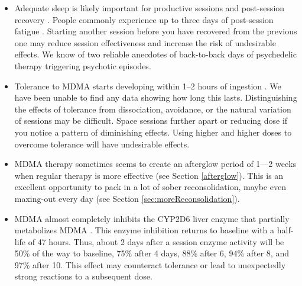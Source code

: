 \documentclass[12pt,letterpaper]{book}
\begin{document}
\begin{itemize}
    \item Adequate sleep is likely important for productive sessions and post-session recovery \cite{simon2020sleep}. People commonly experience up to three days of post-session fatigue \cite{liechtiGender}. Starting another session before you have recovered from the previous one may reduce session effectiveness and increase the risk of undesirable effects. We know of two reliable anecdotes of back-to-back days of psychedelic therapy triggering psychotic episodes. 
    \item Tolerance to MDMA starts developing within 1–2 hours of ingestion \cite{farreTolerance,parrottTolerance}. We have been unable to find any data showing how long this lasts. Distinguishing the effects of tolerance from dissociation, avoidance, or the natural variation of sessions may be difficult. Space sessions further apart or reducing dose if you notice a pattern of diminishing effects. Using higher and higher doses to overcome tolerance will have undesirable effects.
    \item MDMA therapy sometimes seems to create an afterglow period of 1—2 weeks when regular therapy is more effective (see Section \ref{afterglow}). This is an excellent opportunity to pack in a lot of sober reconsolidation, maybe even maxing-out every day (see Section \ref{sec:moreReconsolidation}).
    \item MDMA almost completely inhibits the CYP2D6 liver enzyme that partially metabolizes MDMA \cite{omathunaCYP}. This enzyme inhibition returns to baseline with a half-life of 47 hours. Thus, about 2 days after a session enzyme activity will be 50\% of the way to baseline, 75\% after 4 days, 88\% after 6, 94\% after 8, and 97\% after 10. This effect may counteract tolerance or lead to unexpectedly strong reactions to a subsequent dose.%

\end{itemize}
\end{document}
